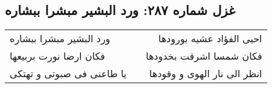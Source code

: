 \begin{center}
\section*{غزل شماره ۲۸۷: ورد البشیر مبشرا ببشاره}
\label{sec:0287}
\begin{longtable}{l p{0.5cm} r}
ورد البشیر مبشرا ببشاره
&&
احیی الفؤاد عشیه بورودها
\\
فکان ارضا نورت بربیعها
&&
فکان شمسا اشرقت بخدودها
\\
یا طاعنی فی صبوتی و تهتکی
&&
انظر الی نار الهوی و وقودها
\\
\end{longtable}
\end{center}
